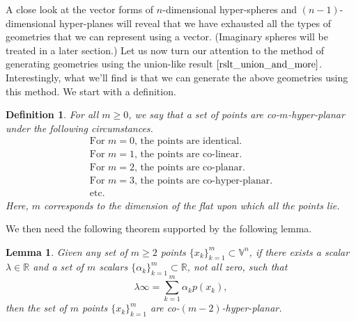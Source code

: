 \documentclass[12pt]{article}
\newcommand{\V}{\mathbb{V}}
\newcommand{\R}{\mathbb{R}}
\newcommand{\nvai}{\infty}
\newtheorem{definition}{Definition}[section]
\newtheorem{lemma}{Lemma}[section]
\begin{document}
A close look at the vector forms of $n$-dimensional hyper-spheres and $(n-1)$-dimensional
hyper-planes will reveal that we have exhausted all the types of geometries that we can
represent using a vector.  (Imaginary spheres will be treated in a later section.)
Let us now turn our attention to the method of generating
geometries using the union-like result $\eqref{rslt_union_and_more}$.  Interestingly, what we'll
find is that we can generate the above geometries using this method.
We start with a definition.
\begin{definition}\label{def_co_hyper_planar}
For all $m\geq 0$, we say that a set of points
are co-$m$-hyper-planar under the following circumstances.
\begin{equation*}
\begin{array}{l}
\mbox{For $m=0$, the points are identical.} \\
\mbox{For $m=1$, the points are co-linear.} \\
\mbox{For $m=2$, the points are co-planar.} \\
\mbox{For $m=3$, the points are co-hyper-planar.} \\
\mbox{etc.}
\end{array}
\end{equation*}
Here, $m$ corresponds to the dimension of the flat upon which all the points lie.
\end{definition}
We then need the following theorem supported by the following lemma.
\begin{lemma}\label{lma_lin_combo_points_is_inf}
Given any set of $m\geq 2$ points $\{x_k\}_{k=1}^m\subset\V^n$, if there exists
a scalar $\lambda\in\R$ and a set of $m$ scalars $\{\alpha_k\}_{k=1}^m\subset\R$, not all zero, such that
\begin{equation*}
\lambda\nvai = \sum_{k=1}^m\alpha_k p(x_k),
\end{equation*}
then the set of $m$ points $\{x_k\}_{k=1}^m$ are co-$(m-2)$-hyper-planar.
\end{lemma}
\end{document}
